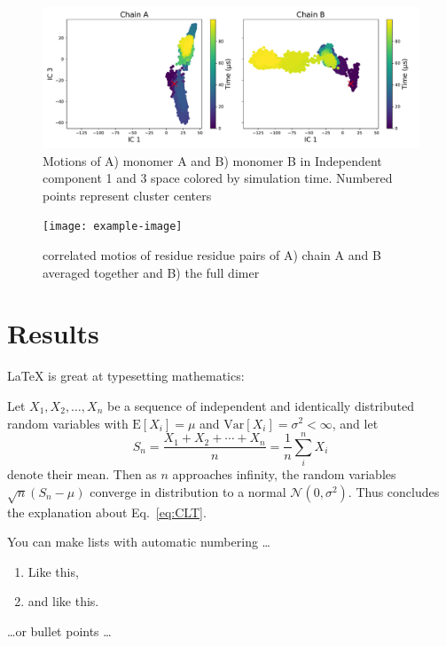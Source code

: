 \documentclass{biophys-new}
\begin{document}
\begin{figure}[h]
\centering
\graphicspath{ {./figures/} }
\includegraphics[width=0.6\linewidth]{fig_4_fdiscolortime_ic3.pdf}
\caption{Motions of A) monomer A and B) monomer B in Independent component 1 and 3 space colored by simulation time. Numbered points represent cluster centers}
\label{fig:view}
\end{figure}

\begin{figure}[mutual-information-heatmap]
\centering
\texttt{[image: example-image]}
\caption{correlated motios of residue residue pairs of A) chain A and B averaged together and B) the full dimer }
\label{fig:view}
\end{figure}

\section*{Results}

\LaTeX{} is great at typesetting mathematics:

Let $X_1, X_2, \ldots, X_n$ be a sequence of independent and identically distributed random variables with $\text{E}[X_i] = \mu$ and $\text{Var}[X_i] = \sigma^2 < \infty$, and let
\begin{equation}
\label{eq:CLT}
S_n = \frac{X_1 + X_2 + \cdots + X_n}{n}
      = \frac{1}{n}\sum_{i}^{n} X_i
\end{equation}
denote their mean. Then as $n$ approaches infinity, the random variables $\sqrt{n}(S_n - \mu)$ converge in distribution to a normal $\mathcal{N}(0, \sigma^2)$. Thus concludes the explanation about Eq.~\ref{eq:CLT}.


You can make lists with automatic numbering \dots

\begin{enumerate}
\item Like this,
\item and like this.
\end{enumerate}

\dots or bullet points \dots
\end{document}

